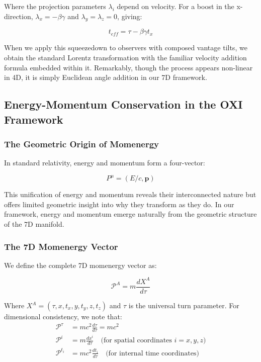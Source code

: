 \documentclass{article}
\begin{document}
Where the projection parameters $\lambda_i$ depend on velocity. For a boost in the x-direction, $\lambda_x = -\beta\gamma$ and $\lambda_y = \lambda_z = 0$, giving:

\begin{equation}
t_{eff} = \tau - \beta\gamma t_x
\end{equation}

When we apply this squeezedown to observers with composed vantage tilts, we obtain the standard Lorentz transformation with the familiar velocity addition formula embedded within it. Remarkably, though the process appears non-linear in 4D, it is simply Euclidean angle addition in our 7D framework.

\subsection{Energy-Momentum Conservation in the OXI Framework}

\subsubsection{The Geometric Origin of Momenergy}

In standard relativity, energy and momentum form a four-vector:

\begin{equation}
P^\mu = (E/c, \mathbf{p})
\end{equation}

This unification of energy and momentum reveals their interconnected nature but offers limited geometric insight into why they transform as they do. In our framework, energy and momentum emerge naturally from the geometric structure of the 7D manifold.

\subsubsection{The 7D Momenergy Vector}

We define the complete 7D momenergy vector as:

\begin{equation}
\mathcal{P}^A = m \frac{dX^A}{d\tau}
\end{equation}

Where $X^A = (\tau, x, t_x, y, t_y, z, t_z)$ and $\tau$ is the universal turn parameter. For dimensional consistency, we note that:
\begin{align}
\mathcal{P}^\tau &= mc^2 \frac{d\tau}{d\tau} = mc^2 \\
\mathcal{P}^i &= m \frac{dx^i}{d\tau} \quad \text{(for spatial coordinates $i = x, y, z$)} \\
\mathcal{P}^{t_i} &= mc^2 \frac{dt_i}{d\tau} \quad \text{(for internal time coordinates)}
\end{align}
\end{document}
